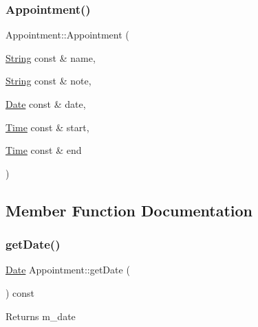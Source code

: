 \mbox{\label{classAppointment_a5ad76b006f94741008318f0a5053b7a0}} 
\subsubsection{\texorpdfstring{Appointment()}{Appointment()}\hspace{0.1cm}{\footnotesize\ttfamily [3/3]}}
{\footnotesize\ttfamily Appointment\+::\+Appointment (\begin{DoxyParamCaption}\item[{\hyperlink{classString}{String} const \&}]{name,  }\item[{\hyperlink{classString}{String} const \&}]{note,  }\item[{\hyperlink{classDate}{Date} const \&}]{date,  }\item[{\hyperlink{classTime}{Time} const \&}]{start,  }\item[{\hyperlink{classTime}{Time} const \&}]{end }\end{DoxyParamCaption})}



\subsection{Member Function Documentation}
\mbox{\label{classAppointment_ac4f82720deaa4daf6679d1c60fadfb67}} 
\subsubsection{\texorpdfstring{get\+Date()}{getDate()}}
{\footnotesize\ttfamily \hyperlink{classDate}{Date} Appointment\+::get\+Date (\begin{DoxyParamCaption}{ }\end{DoxyParamCaption}) const}

\begin{DoxyReturn}{Returns}
m\+\_\+date 
\end{DoxyReturn}
\mbox{\label{classAppointment_a5ba3b128ad963c9676af3fb199b98613}} 
